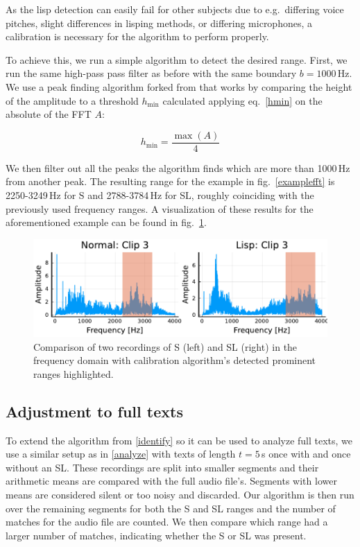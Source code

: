 \documentclass{IEEEtran}
\begin{document}
As the lisp detection can easily fail for other subjects due to e.g.\ differing voice pitches,
slight differences in lisping methods, or differing microphones,
a calibration is necessary for the algorithm to perform properly.

To achieve this,
we run a simple algorithm to detect the desired range.
First, we run the same high-pass pass filter as before with the same boundary \(b = 1000\)\,Hz.
We use a peak finding algorithm forked from \cite{findpeaks} that works by comparing the height of the amplitude to a threshold \(h_\mathrm{min}\) calculated applying eq.\ \ref{hmin} on the absolute of the FFT \(A\):

\begin{equation}
h_\mathrm{min} = \frac{\max(A)}{4}
\label{hmin}
\end{equation}

We then filter out all the peaks the algorithm finds which are more than 1000\,Hz from another peak.
The resulting range for the example in fig.\ \ref{examplefft} is 2250-3249\,Hz for S and 2788-3784\,Hz for SL,
roughly coinciding with the previously used frequency ranges.
A visualization of these results for the aforementioned example can be found in fig.\ \ref{examplecalibration}.

\begin{figure}[h]
\centering
\includegraphics[scale=0.55]{calibration.pdf}
\caption{Comparison of two recordings of S (left) and SL (right) in the frequency domain with calibration algorithm's detected prominent ranges highlighted.}\label{examplecalibration}
\end{figure}

\subsection{Adjustment to full texts}

To extend the algorithm from \ref{identify} so it can be used to analyze full texts,
we use a similar setup as in \ref{analyze} with texts of length \(t = 5\)\,s once with and once without an SL.
These recordings are split into smaller segments and their arithmetic means are compared with the full audio file's.
Segments with lower means are considered silent or too noisy and discarded.
Our algorithm is then run over the remaining segments for both the S and SL ranges and the number of matches for the audio file are counted.
We then compare which range had a larger number of matches,
indicating whether the S or SL was present.
\end{document}
